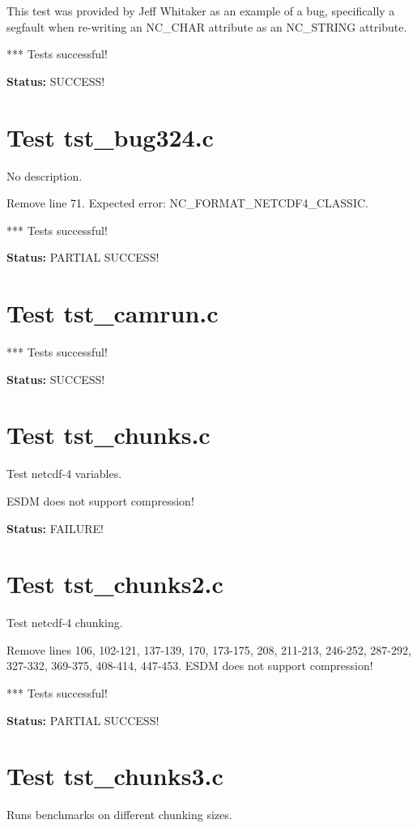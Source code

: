 This test was provided by Jeff Whitaker as an example of a bug,
specifically a segfault when re-writing an NC\_CHAR attribute as
an NC\_STRING attribute.

*** Tests successful!

{\bf \large Status: } SUCCESS!

\section{Test tst\_bug324.c}

No description.

Remove line 71. Expected error: NC\_FORMAT\_NETCDF4\_CLASSIC.

*** Tests successful!

{\bf \large Status: } PARTIAL SUCCESS!

\section{Test tst\_camrun.c}

*** Tests successful!

{\bf \large Status: } SUCCESS!

\section{Test tst\_chunks.c}

Test netcdf-4 variables.

ESDM does not support compression!

{\bf \large Status: } FAILURE!

\section{Test tst\_chunks2.c}

Test netcdf-4 chunking.

Remove lines 106, 102-121, 137-139, 170, 173-175, 208, 211-213, 246-252, 287-292, 327-332, 369-375, 408-414, 447-453. ESDM does not support compression!

*** Tests successful!

{\bf \large Status: } PARTIAL SUCCESS!

\section{Test tst\_chunks3.c}

Runs benchmarks on different chunking sizes.

